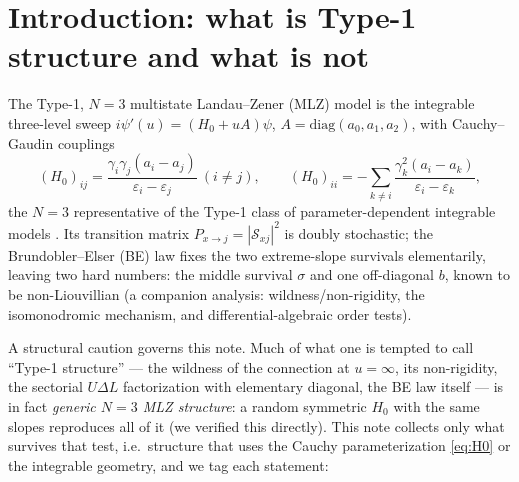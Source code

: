 \documentclass[11pt]{article}
\theoremstyle{definition}
\theoremstyle{remark}
\newcommand{\eps}{\varepsilon}
\newcommand{\diag}{\mathrm{diag}}
\newcommand{\Scat}{\mathcal{S}}
\begin{document}
\section{Introduction: what is Type-1 structure and what is not}\label{sec:intro}

The Type-1, $N{=}3$ multistate Landau--Zener (MLZ) model is the integrable three-level
sweep $i\psi'(u)=(H_0+uA)\psi$, $A=\diag(a_0,a_1,a_2)$, with Cauchy--Gaudin couplings
\begin{equation}\label{eq:H0}
(H_0)_{ij}=\frac{\gamma_i\gamma_j(a_i-a_j)}{\eps_i-\eps_j}\ (i\neq j),\qquad
(H_0)_{ii}=-\sum_{k\neq i}\frac{\gamma_k^2(a_i-a_k)}{\eps_i-\eps_k},
\end{equation}
the $N{=}3$ representative of the Type-1 class of parameter-dependent integrable models
\cite{OWY2009,OY2011,Y2018,SC2017}. Its transition matrix $P_{x\to j}=|\Scat_{xj}|^2$ is
doubly stochastic; the Brundobler--Elser (BE) law \cite{BE1993,VO2004,DS2006} fixes the
two extreme-slope survivals elementarily, leaving two hard numbers: the middle survival
$\sigma$ and one off-diagonal $b$, known to be non-Liouvillian (a companion analysis:
wildness/non-rigidity, the isomonodromic mechanism, and differential-algebraic order
tests).

A structural caution governs this note. Much of what one is tempted to call ``Type-1
structure'' --- the wildness of the connection at $u=\infty$, its non-rigidity, the
sectorial $U\Delta L$ factorization with elementary diagonal, the BE law itself --- is
in fact \emph{generic $N{=}3$ MLZ structure}: a random symmetric $H_0$ with the same
slopes reproduces all of it (we verified this directly). This note collects only what
survives that test, i.e.\ structure that uses the Cauchy parameterization
\eqref{eq:H0} or the integrable geometry, and we tag each statement:
\end{document}
